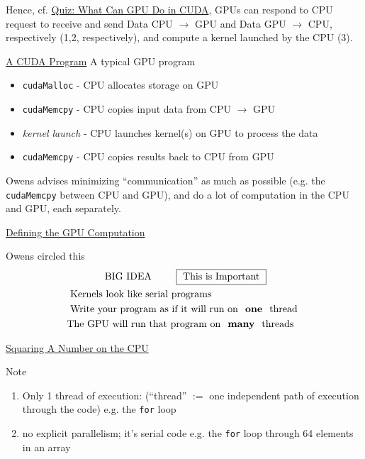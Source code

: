 \documentclass[10pt]{amsart}
\begin{document}
\begin{multicols*}{2}
Hence, cf. \href{https://classroom.udacity.com/courses/cs344/lessons/55120467/concepts/670489380923}{Quiz: What Can GPU Do in CUDA}, GPUs can respond to CPU request to receive and send Data CPU $\to $ GPU and Data GPU $\to $ CPU, respectively (1,2, respectively), and compute a kernel launched by the CPU (3).


\href{https://classroom.udacity.com/courses/cs344/lessons/55120467/concepts/670742800923}{A CUDA Program}
A typical GPU program

\begin{itemize}
\item \verb|cudaMalloc| - CPU allocates storage on GPU 
\item \verb|cudaMemcpy| - CPU copies input data from CPU $\to $ GPU 
\item \emph{kernel launch} - CPU launches kernel(s) on GPU to process the data 
\item \verb|cudaMemcpy| - CPU copies results back to CPU from GPU
  \end{itemize}

Owens advises minimizing ``communication'' as much as possible (e.g. the \verb|cudaMemcpy| between CPU and GPU), and do a lot of computation in the CPU and GPU, each separately.

\href{https://classroom.udacity.com/courses/cs344/lessons/55120467/concepts/672300540923}{Defining the GPU Computation}

Owens circled this
{\Large
  \[
  \begin{gathered}
\text{ BIG IDEA } \qquad \, \boxed{ \text{ This is Important } }  \\
\begin{aligned} 
& \text{ Kernels look like serial programs } \\
  & \text{ Write your program as if it will run on \textbf{ one } thread } \\
  & \text{The GPU will run that program on \textbf{ many } threads}
  \end{aligned}
\end{gathered}
\]
}

\href{https://classroom.udacity.com/courses/cs344/lessons/55120467/concepts/670742840923}{Squaring A Number on the CPU}

Note
\begin{enumerate}
\item Only 1 thread of execution: (``thread'' $:=$ one independent path of execution through the code) e.g. the \verb|for| loop
  \item no explicit parallelism; it's serial code e.g. the \verb|for| loop through 64 elements in an array
  \end{enumerate}



\end{multicols*}
\end{document}
